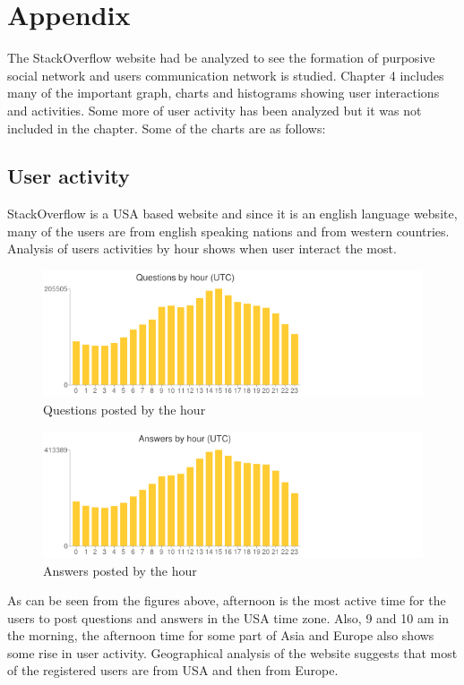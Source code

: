 

\chapter{Appendix} \label{Chapter:Appendix}

The StackOverflow website had be analyzed to see the formation of purposive social network and users communication network is studied. Chapter 4 includes many of the important graph, charts and histograms showing user interactions and activities. Some more of user activity has been analyzed but it was not included in the chapter. Some of the charts are as follows:

\section{User activity}

StackOverflow is a USA based website and since it is an english language website, many of the users are from english speaking nations and from western countries. Analysis of users activities by hour shows when user interact the most. 

\begin{figure}[!htb]
  \centering
  \includegraphics[width=15cm]{chart8.png}
  \caption{Questions posted by the hour}
  \label{Figure:figexa1}
\end{figure}

\begin{figure}[!htb]
  \centering
  \includegraphics[width=15cm]{chart9.png}
  \caption{Answers posted by the hour}
  \label{Figure:figexa2}
\end{figure}

As can be seen from the figures above, afternoon is the most active time for the users to post questions and answers in the USA time zone. Also, 9 and 10 am in the morning, the afternoon time for some part of Asia and Europe also shows some rise in user activity. Geographical analysis of the website suggests that most of the registered users are from USA and then from Europe.